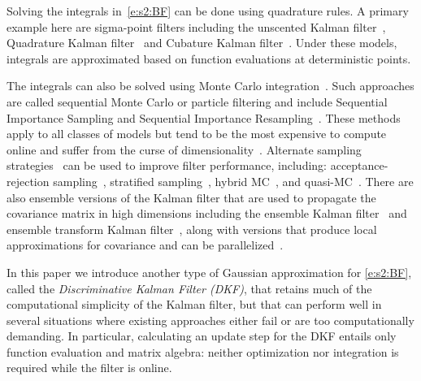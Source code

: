 Solving the integrals in~\eqref{e:s2:BF} can be done using quadrature rules.  A primary example here are sigma-point filters including the unscented Kalman filter~\cite{Jul97,Wan00,van04}, Quadrature Kalman filter~\cite{Ito00,Ito00b} and  Cubature Kalman filter~\cite{Ara07,Ara09}.  Under these models, integrals are approximated based on function evaluations at deterministic points.

The integrals can also be solved using Monte Carlo integration~\cite{Met49}. Such approaches are called sequential Monte Carlo or particle filtering and include Sequential Importance Sampling and Sequential Importance Resampling~\cite{Han69,Han70,Gor93,Kit96,del96,Dou00,Cap05,Cap07}.    These methods apply to all classes of models but tend to be the most expensive to compute online and suffer from the curse of dimensionality~\cite{Dau03}.  Alternate sampling strategies~\cite[see, e.g.,][]{Che03,Liu08} can be used to improve filter performance, including: acceptance-rejection sampling~\cite{Han69}, stratified sampling~\cite{Dou05}, hybrid MC~\cite{Cho01}, and quasi-MC~\cite{Ger15}.  There are also ensemble versions of the Kalman filter that are used to propagate the covariance matrix in high dimensions including the ensemble Kalman filter~\cite[enKF:][]{Gei94} and ensemble transform Kalman filter~\cite[ETKF:][]{Bis01,Maj02}, along with versions that produce local approximations for covariance and can be parallelized~\cite{Ott02,Ott04,Hun07}.

In this paper we introduce another type of Gaussian approximation for \eqref{e:s2:BF}, called the {\em Discriminative Kalman Filter (DKF)}, that retains much of the computational simplicity of the Kalman filter, but that can perform well in several situations where existing approaches either fail or are too computationally demanding.  In particular, calculating an update step for the DKF entails only function evaluation and matrix algebra: neither optimization nor integration is required while the filter is online.

